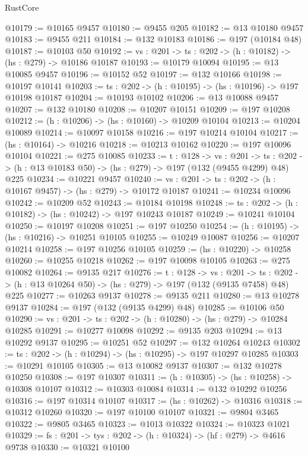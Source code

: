 \begin{lexlean}{RustCore}
\begin{coremodule}
@10179 := @10165 @9457
@10180 := @9455 @205
@10182 := @13 @10180 @9457
@10183 := @9455 @211
@10184 := @132 @10183
@10186 := @197 (@10184 @48)
@10187 := @10103 @50
@10192 := {vs : @201} -> {ts : @202} -> (h : @10182) -> (hs : @279) -> @10186 @10187
@10193 := @10179 @10094
@10195 := @13 @10085 @9457
@10196 := @10152 @52
@10197 := @132 @10166
@10198 := @10197 @10141
@10203 := {ts : @202} -> (h : @10195) -> (hs : @10196) -> @197 @10198 @10187
@10204 := @10193 @10102
@10206 := @13 @10088 @9457
@10207 := @132 @10180
@10208 := @10207 @10151
@10209 := @197 @10208
@10212 := (h : @10206) -> (hs : @10160) -> @10209 @10104
@10213 := @10204 @10089
@10214 := @10097 @10158
@10216 := @197 @10214 @10104
@10217 := (hs : @10164) -> @10216
@10218 := @10213 @10162
@10220 := @197 @10096 @10104
@10221 := @275 @10085
@10233 := {t : @128} ->
  {vs : @201} ->
  {ts : @202} -> (h : @13 @10183 @50) -> (hs : @279) -> @197 (@132 (@9455 @4299) @48) @225
@10234 := @10221 @9457
@10240 := {vs : @201} -> {ts : @202} -> (h : @10167 @9457) -> (hs : @279) -> @10172 @10187
@10241 := @10234 @10096
@10242 := @10209 @52
@10243 := @10184 @10198
@10248 := {ts : @202} -> (h : @10182) -> (hs : @10242) -> @197 @10243 @10187
@10249 := @10241 @10104
@10250 := @10197 @10208
@10251 := @197 @10250
@10254 := (h : @10195) -> (hs : @10216) -> @10251 @10105
@10255 := @10249 @10087
@10256 := @10207 @10214
@10258 := @197 @10256 @10105
@10259 := (hs : @10220) -> @10258
@10260 := @10255 @10218
@10262 := @197 @10098 @10105
@10263 := @275 @10082
@10264 := @9135 @217
@10276 := {t : @128} ->
  {vs : @201} ->
  {ts : @202} -> (h : @13 @10264 @50) -> (hs : @279) -> @197 (@132 (@9135 @7458) @48) @225
@10277 := @10263 @9137
@10278 := @9135 @211
@10280 := @13 @10278 @9137
@10284 := @197 (@132 (@9135 @4299) @48)
@10285 := @10106 @50
@10290 := {vs : @201} -> {ts : @202} -> (h : @10280) -> (hs : @279) -> @10284 @10285
@10291 := @10277 @10098
@10292 := @9135 @203
@10294 := @13 @10292 @9137
@10295 := @10251 @52
@10297 := @132 @10264 @10243
@10302 := {ts : @202} -> (h : @10294) -> (hs : @10295) -> @197 @10297 @10285
@10303 := @10291 @10105
@10305 := @13 @10082 @9137
@10307 := @132 @10278 @10250
@10308 := @197 @10307
@10311 := (h : @10305) -> (hs : @10258) -> @10308 @10107
@10312 := @10303 @10084
@10314 := @132 @10292 @10256
@10316 := @197 @10314 @10107
@10317 := (hs : @10262) -> @10316
@10318 := @10312 @10260
@10320 := @197 @10100 @10107
@10321 := @9804 @3465
@10322 := @9805 @3465
@10323 := @1013 @10322
@10324 := @10323 @1021
@10329 := {fs : @201} -> {tys : @202} -> (h : @10324) -> (hf : @279) -> @4616 @9738
@10330 := @10321 @10100

\end{coremodule}
\end{lexlean}
